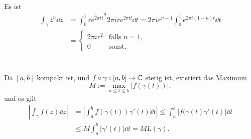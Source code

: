\documentclass[a4paper,10pt]{article}
\begin{document}
\subsection{}
Es ist
\begin{align*}
 \int_\gamma \overline{z}^n \dd{z}
 &= \int_0^1 \overline{r e^{2\pi i t}}^n 2\pi i r e^{2\pi i t} \dd{t}
 = 2\pi i r^{n+1} \int_0^1 e^{2\pi i (1-n) t} \dd{t} \\
 &= \begin{cases} 2\pi i r^2 & \text{falls } n=1, \\ 0 & \text{sonst}. \end{cases}
\end{align*}


\subsection{}





\addtocounter{section}{1}





\section{}
Da $[a,b]$ kompakt ist, und $f \circ \gamma : [a,b] \to \mathbb{C}$ stetig ist, existiert das Maximum
\[
 M := \max_{a \leq t \leq b} |f(\gamma(t))|,
\]
und es gilt
\begin{align*}
 \left| \int_\gamma f(z) \dd{z} \right|
 &= \left| \int_a^b f(\gamma(t)) \gamma'(t) \dd{t} \right|
 \leq \int_a^b |f(\gamma(t) \gamma'(t) | \dd{t} \\
 &\leq M \int_a^b |\gamma'(t)| \dd{t}
 = M L(\gamma).
\end{align*}
\end{document}
